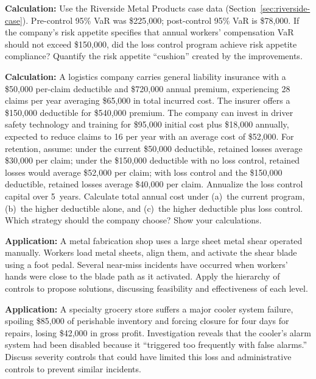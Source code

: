 \documentclass[11pt,openany]{book}
\begin{document}
\begin{discussionquestions}
\item \textbf{Calculation:} Use the Riverside Metal Products case data
  (Section~\ref{sec:riverside-case}). Pre-control 95\% VaR was \$225{,}000;
  post-control 95\% VaR is \$78{,}000. If the company's risk appetite
  specifies that annual workers' compensation VaR should not exceed
  \$150{,}000, did the loss control program achieve risk appetite compliance?
  Quantify the risk appetite ``cushion'' created by the improvements.

\item \textbf{Calculation:} A logistics company carries general liability
  insurance with a \$50{,}000 per-claim deductible and \$720{,}000 annual
  premium, experiencing 28 claims per year averaging \$65{,}000 in total
  incurred cost. The insurer offers a \$150{,}000 deductible for \$540{,}000
  premium. The company can invest in driver safety technology and training for
  \$95{,}000 initial cost plus \$18{,}000 annually, expected to reduce claims
  to 16 per year with an average cost of \$52{,}000. For retention, assume:
  under the current \$50{,}000 deductible, retained losses average \$30{,}000
  per claim; under the \$150{,}000 deductible with no loss control, retained
  losses would average \$52{,}000 per claim; with loss control and the
  \$150{,}000 deductible, retained losses average \$40{,}000 per claim.
  Annualize the loss control capital over 5~years. Calculate total annual cost
  under (a)~the current program, (b)~the higher deductible alone, and
  (c)~the higher deductible plus loss control. Which strategy should the
  company choose? Show your calculations.

\item \textbf{Application:} A metal fabrication shop uses a large sheet metal
  shear operated manually. Workers load metal sheets, align them, and activate
  the shear blade using a foot pedal. Several near-miss incidents have
  occurred when workers' hands were close to the blade path as it activated.
  Apply the hierarchy of controls to propose solutions, discussing feasibility
  and effectiveness of each level.

\item \textbf{Application:} A specialty grocery store suffers a major cooler
  system failure, spoiling \$85{,}000 of perishable inventory and forcing
  closure for four days for repairs, losing \$42{,}000 in gross profit.
  Investigation reveals that the cooler's alarm system had been disabled
  because it ``triggered too frequently with false alarms.'' Discuss severity
  controls that could have limited this loss and administrative controls to
  prevent similar incidents.


\end{discussionquestions}
\end{document}
